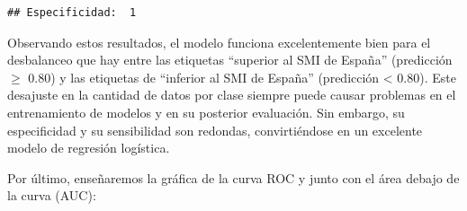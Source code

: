 \documentclass[
]{article}
\newenvironment{Shaded}{\begin{snugshade}}{\end{snugshade}}
\newcommand{\AttributeTok}[1]{\textcolor[rgb]{0.13,0.29,0.53}{#1}}
\newcommand{\CommentTok}[1]{\textcolor[rgb]{0.56,0.35,0.01}{\textit{#1}}}
\newcommand{\DecValTok}[1]{\textcolor[rgb]{0.00,0.00,0.81}{#1}}
\newcommand{\FunctionTok}[1]{\textcolor[rgb]{0.13,0.29,0.53}{\textbf{#1}}}
\newcommand{\NormalTok}[1]{#1}
\newcommand{\OtherTok}[1]{\textcolor[rgb]{0.56,0.35,0.01}{#1}}
\newcommand{\SpecialCharTok}[1]{\textcolor[rgb]{0.81,0.36,0.00}{\textbf{#1}}}
\newcommand{\StringTok}[1]{\textcolor[rgb]{0.31,0.60,0.02}{#1}}
\begin{document}
\begin{Shaded}
\end{Shaded}

\begin{verbatim}
## Especificidad:  1
\end{verbatim}

Observando estos resultados, el modelo funciona excelentemente bien para
el desbalanceo que hay entre las etiquetas ``superior al SMI de España''
(predicción \(\geq\) 0.80) y las etiquetas de ``inferior al SMI de
España'' (predicción \textless{} 0.80). Este desajuste en la cantidad de
datos por clase siempre puede causar problemas en el entrenamiento de
modelos y en su posterior evaluación. Sin embargo, su especificidad y su
sensibilidad son redondas, convirtiéndose en un excelente modelo de
regresión logística.

Por último, enseñaremos la gráfica de la curva ROC y junto con el área
debajo de la curva (AUC):

\begin{Shaded}
\end{Shaded}
\end{document}
